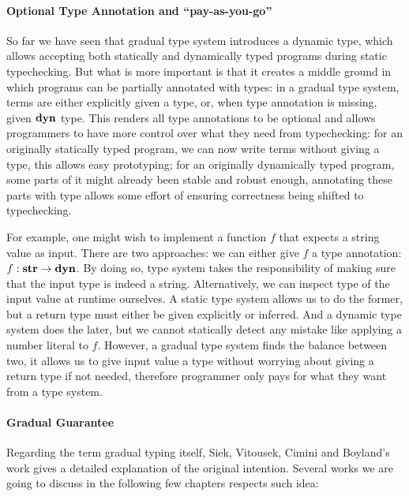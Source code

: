 \paragraph{Optional Type Annotation and ``pay-as-you-go''}

So far we have seen that gradual type system introduces a dynamic type,
which allows accepting both statically and dynamically typed programs during static typechecking.
But what is more important is that it creates a middle ground in which programs
can be partially annotated with types:
in a gradual type system, terms are either explicitly given a type,
or, when type annotation is missing, given $\textbf{dyn}$ type.
This renders all type annotations to be optional and allows programmers
to have more control over what they need from typechecking:
for an originally statically typed program, we can now write terms without giving a type,
this allows easy prototyping; for an originally dynamically typed program,
some parts of it might already been stable and robust enough, annotating these parts
with type allows some effort of ensuring correctness being shifted to typechecking.

For example, one might wish to implement a function $f$ that expects a string value
as input. There are two approaches: we can either give $f$ a type annotation:
$f : \textbf{str} \rightarrow \textbf{dyn}$. By doing so, type system takes the responsibility
of making sure that the input type is indeed a string. Alternatively,
we can inspect type of the input value at runtime ourselves.
A static type system allows us to do the former, but a return type must either
be given explicitly or inferred. And a dynamic type system does the later, but
we cannot statically detect any mistake like applying a number literal to $f$.
However, a gradual type system finds the balance between two,
it allows us to give input value a type without worrying about
giving a return type if not needed,
therefore programmer only pays for what they want from a type system.




\paragraph{Gradual Guarantee}

Regarding the term gradual typing itself,
Siek, Vitousek, Cimini and Boyland's work gives a detailed explanation of
the original intention.
Several works we are going to discuss in the following few chapters respects
such idea:


